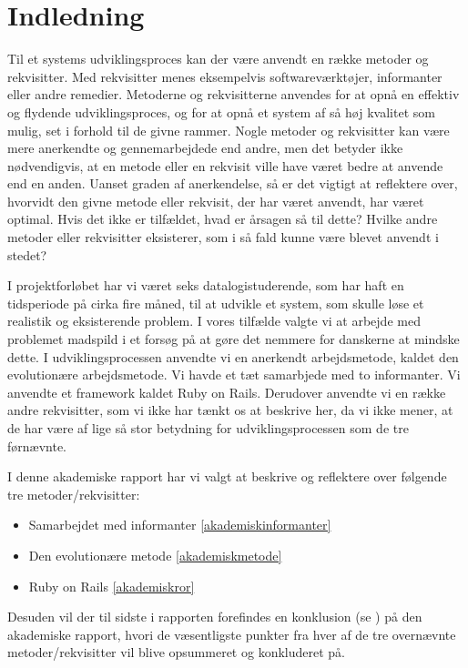 \chapter{Indledning}

Til et systems udviklingsproces kan der være anvendt en række metoder og rekvisitter. Med rekvisitter menes eksempelvis softwareværktøjer, informanter eller andre remedier. Metoderne og rekvisitterne anvendes for at opnå en effektiv og flydende udviklingsproces, og for at opnå et system af så høj kvalitet som mulig, set i forhold til de givne rammer. Nogle metoder og rekvisitter kan være mere anerkendte og gennemarbejdede end andre, men det betyder ikke nødvendigvis, at en metode eller en rekvisit ville have været bedre at anvende end en anden. Uanset graden af anerkendelse, så er det vigtigt at reflektere over, hvorvidt den givne metode eller rekvisit, der har været anvendt, har været optimal. Hvis det ikke er tilfældet, hvad er årsagen så til dette? Hvilke andre metoder eller rekvisitter eksisterer, som i så fald kunne være blevet anvendt i stedet?

I projektforløbet har vi været seks datalogistuderende, som har haft en tidsperiode på cirka fire måned, til at udvikle et system, som skulle løse et realistik og eksisterende problem. I vores tilfælde valgte vi at arbejde med problemet madspild i et forsøg på at gøre det nemmere for danskerne at mindske dette. I udviklingsprocessen anvendte vi en anerkendt arbejdsmetode, kaldet den evolutionære arbejdsmetode. Vi havde et tæt samarbjede med to informanter. Vi anvendte et framework kaldet Ruby on Rails. Derudover anvendte vi en række andre rekvisitter, som vi ikke har tænkt os at beskrive her, da vi ikke mener, at de har være af lige så stor betydning for udviklingsprocessen som de tre førnævnte.

I denne akademiske rapport har vi valgt at beskrive og reflektere over følgende tre metoder/rekvisitter:

\begin{itemize}[noitemsep]
  \item Samarbejdet med informanter \ref{akademiskinformanter}
  \item Den evolutionære metode \ref{akademiskmetode}
  \item Ruby on Rails \ref{akademiskror}
\end{itemize}

Desuden vil der til sidste i rapporten forefindes en konklusion (se ) på den akademiske rapport, hvori de væsentligste punkter fra hver af de tre overnævnte metoder/rekvisitter vil blive opsummeret og konkluderet på.

